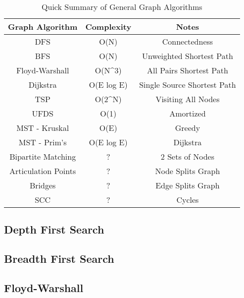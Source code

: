 \documentclass{article}
\begin{document}
\begin{table}[H]
\begin{tabular}{|c|c|c|}
\hline
Graph Algorithm     & Complexity              & Notes                       \\ \hline
DFS                 & O(N)                    & Connectedness               \\ \hline
BFS                 & O(N)                    & Unweighted Shortest Path    \\ \hline
Floyd-Warshall      & O(N\textasciicircum{}3) & All Pairs Shortest Path     \\ \hline
Dijkstra            & O(E log E)              & Single Source Shortest Path \\ \hline
TSP                 & O(2\textasciicircum{}N) & Visiting All Nodes          \\ \hline
UFDS                & O(1)                    & Amortized                   \\ \hline
MST - Kruskal       & O(E)                    & Greedy                      \\ \hline
MST - Prim's        & O(E log E)              & Dijkstra                    \\ \hline
Bipartite Matching  & ?                       & 2 Sets of Nodes             \\ \hline
Articulation Points & ?                       & Node Splits Graph           \\ \hline
Bridges             & ?                       & Edge Splits Graph           \\ \hline
SCC                 & ?                       & Cycles                      \\ \hline
\end{tabular}
\caption{Quick Summary of General Graph Algorithms}
\label{tab:gt}
\end{table}

\subsection{Depth First Search}

\subsection{Breadth First Search}

\subsection{Floyd-Warshall}

\end{document}
